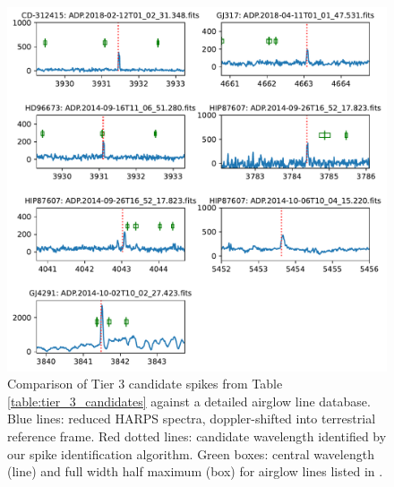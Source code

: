 \documentclass[twocolumn]{aastex701}
\begin{document}
\begin{figure}
    \centering  \includegraphics[width=\textwidth]{airglow_reanalysis.pdf}
    \caption{Comparison of Tier 3 candidate spikes from Table \ref{table:tier_3_candidates} against a detailed airglow line database.  Blue lines: reduced HARPS spectra, doppler-shifted into terrestrial reference frame.  Red dotted lines: candidate wavelength identified by our spike identification algorithm. Green boxes: central wavelength (line) and full width half maximum (box) for airglow lines listed in  \cite{faint_airglow_database}.}
    \label{fig:airglow_reanalysis}
\end{figure}
\end{document}

